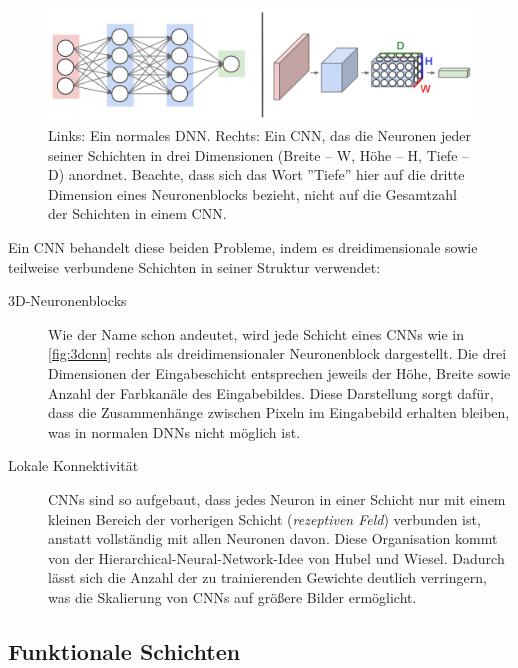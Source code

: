 \begin{figure}[!ht]
	\centering
	\includegraphics[width=\linewidth]{images/3DCNN}
	\caption{Links: Ein normales DNN. Rechts: Ein CNN, das die Neuronen jeder seiner Schichten in drei Dimensionen (Breite – W, Höhe – H, Tiefe – D) anordnet. Beachte, dass sich das Wort ''Tiefe'' hier auf die dritte Dimension eines Neuronenblocks bezieht, nicht auf die Gesamtzahl der Schichten in einem CNN.  \protect\cite{CS231nCNNarchitecture}}
	\label{fig:3dcnn}
\end{figure}

Ein CNN behandelt diese beiden Probleme, indem es dreidimensionale sowie teilweise verbundene Schichten in seiner Struktur verwendet:

\begin{description}
	\item[3D-Neuronenblocks]
	
	Wie der Name schon andeutet, wird jede Schicht eines CNNs wie in \autoref{fig:3dcnn} rechts als dreidimensionaler Neuronenblock dargestellt. Die drei Dimensionen der Eingabeschicht entsprechen jeweils der Höhe, Breite sowie Anzahl der Farbkanäle des Eingabebildes. Diese Darstellung sorgt dafür, dass die Zusammenhänge zwischen Pixeln im Eingabebild erhalten bleiben, was in normalen DNNs nicht möglich ist.

	\item[Lokale Konnektivität]
	
	CNNs sind so aufgebaut, dass jedes Neuron in einer Schicht nur mit einem kleinen Bereich der vorherigen Schicht (\emph{rezeptiven Feld}) verbunden ist, anstatt vollständig mit allen Neuronen davon. Diese Organisation kommt von der Hierarchical-Neural-Network-Idee von Hubel und Wiesel. Dadurch lässt sich die Anzahl der zu trainierenden Gewichte deutlich verringern, was die Skalierung von CNNs auf größere Bilder ermöglicht.
	
\end{description}

\subsection{Funktionale Schichten} \label{sec:CNN-Funktionale_Schichten}

